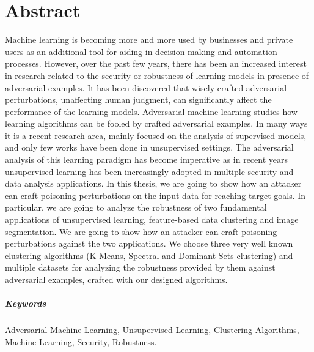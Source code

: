 	\chapter*{Abstract}
	Machine learning is becoming more and more used by businesses and private users as an additional tool for aiding in decision making and automation processes.
	However, over the past few years, there has been an increased interest in research related to the security or robustness of learning models in presence of adversarial examples. It has been discovered that wisely crafted adversarial perturbations, unaffecting human judgment, can significantly affect the performance of the learning models. Adversarial machine learning studies how learning algorithms can be fooled by crafted adversarial examples. In many ways it is a recent research area, mainly focused on the analysis of supervised models, and only few works have been done in unsupervised settings. The adversarial analysis of this learning paradigm has become imperative as in recent years unsupervised learning has been increasingly adopted in multiple security and data analysis applications.
	In this thesis, we are going to show how an attacker can craft poisoning perturbations on the input data for reaching target goals. In particular, we are going to analyze the robustness of two fundamental applications of unsupervised learning, feature-based data clustering and image segmentation. We are going to show how an attacker can craft poisoning perturbations against the two applications. We choose three very well known clustering algorithms (K-Means, Spectral and Dominant Sets clustering) and multiple datasets for analyzing the robustness provided by them against adversarial examples, crafted with our designed algorithms.
	
	
	
	\paragraph{Keywords} 
	Adversarial Machine Learning, Unsupervised Learning, Clustering Algorithms, Machine Learning, Security, Robustness.
	
	\tableofcontents
	
